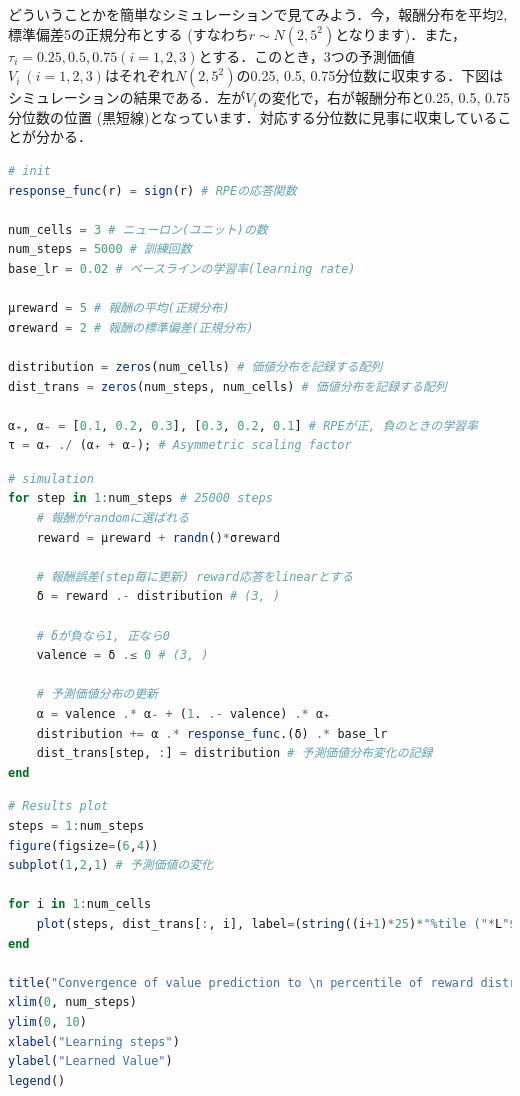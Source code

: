 どういうことかを簡単なシミュレーションで見てみよう．今，報酬分布を平均2, 標準偏差5の正規分布とする (すなわち$r \sim N(2, 5^2)$となります)．また，$\tau_i = 0.25, 0.5, 0.75 (i=1,2,3)$とする．このとき，3つの予測価値 $V_i \ (i=1,2,3)$はそれぞれ$N(2, 5^2)$の0.25, 0.5,
0.75分位数に収束する．下図はシミュレーションの結果である．左が$V_i$の変化で，右が報酬分布と0.25, 0.5, 0.75分位数の位置 (黒短線)となっています．対応する分位数に見事に収束していることが分かる．
\begin{lstlisting}[language=julia]
# init 
response_func(r) = sign(r) # RPEの応答関数
 
num_cells = 3 # ニューロン(ユニット)の数
num_steps = 5000 # 訓練回数
base_lr = 0.02 # ベースラインの学習率(learning rate)
 
μreward = 5 # 報酬の平均(正規分布)
σreward = 2 # 報酬の標準偏差(正規分布)
 
distribution = zeros(num_cells) # 価値分布を記録する配列
dist_trans = zeros(num_steps, num_cells) # 価値分布を記録する配列
 
α₊, α₋ = [0.1, 0.2, 0.3], [0.3, 0.2, 0.1] # RPEが正, 負のときの学習率
τ = α₊ ./ (α₊ + α₋); # Asymmetric scaling factor
\end{lstlisting}
\begin{lstlisting}[language=julia]
# simulation
for step in 1:num_steps # 25000 steps
    # 報酬がrandomに選ばれる
    reward = μreward + randn()*σreward
     
    # 報酬誤差(step毎に更新) reward応答をlinearとする
    δ = reward .- distribution # (3, )
 
    # δが負なら1, 正なら0
    valence = δ .≤ 0 # (3, )
 
    # 予測価値分布の更新
    α = valence .* α₋ + (1. .- valence) .* α₊
    distribution += α .* response_func.(δ) .* base_lr
    dist_trans[step, :] = distribution # 予測価値分布変化の記録
end
\end{lstlisting}
\begin{lstlisting}[language=julia]
# Results plot
steps = 1:num_steps
figure(figsize=(6,4))
subplot(1,2,1) # 予測価値の変化

for i in 1:num_cells   
    plot(steps, dist_trans[:, i], label=(string((i+1)*25)*"%tile ("*L"$\tau=$"*string((i+1)*0.25)*")"))
end

title("Convergence of value prediction to \n percentile of reward distribution")
xlim(0, num_steps)
ylim(0, 10)
xlabel("Learning steps")
ylabel("Learned Value")
legend()
\end{lstlisting}
